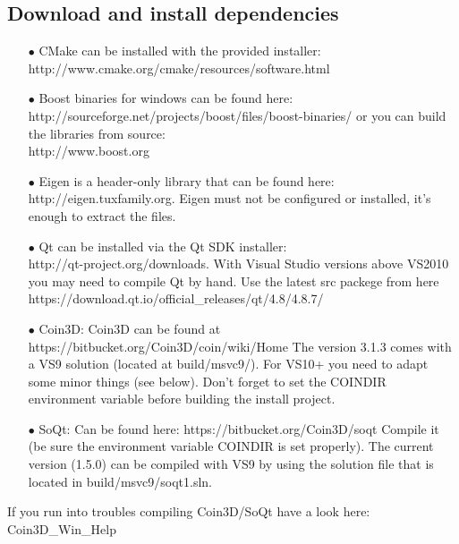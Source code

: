 \documentclass{book}
\begin{document}
\subsection{Download and install dependencies}
\begin{itemize}

\item[$\bullet$]CMake can be installed with the provided installer: \\http://www.cmake.org/cmake/resources/software.html
\item[$\bullet$]Boost binaries for windows can be found here: \\http://sourceforge.net/projects/boost/files/boost-binaries/ or you can build the libraries from source: \\http://www.boost.org 
\item[$\bullet$]Eigen is a header-only library that can be found here: \\http://eigen.tuxfamily.org. Eigen must not be configured or installed, it's enough to extract the files. 
\item[$\bullet$]Qt can be installed via the Qt SDK installer: \\http://qt-project.org/downloads. With Visual Studio versions above VS2010 you may need to compile Qt by hand. Use the latest src packege from here \\https://download.qt.io/official\_releases/qt/4.8/4.8.7/
\item[$\bullet$]Coin3D: Coin3D can be found at \\https://bitbucket.org/Coin3D/coin/wiki/Home The version 3.1.3 comes with a VS9 solution (located at build/msvc9/). For VS10+ you need to adapt some minor things (see below). Don't forget to set the COINDIR environment variable before building the install project.
\item[$\bullet$]SoQt: Can be found here: https://bitbucket.org/Coin3D/soqt Compile it (be sure the environment variable COINDIR is set properly). The current version (1.5.0) can be compiled with VS9 by using the solution file that is located in build/msvc9/soqt1.sln. 
\end{itemize}If you run into troubles compiling Coin3D/SoQt have a look here: \\Coin3D\_Win\_Help
\end{document}
